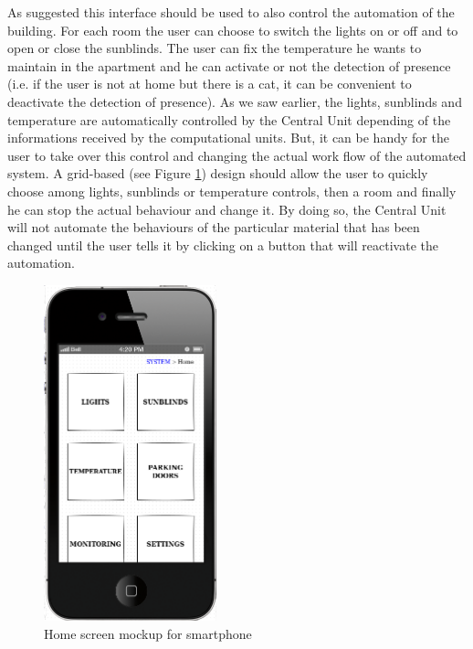 \documentclass{acm_proc_article-sp}
\begin{document}
As suggested this interface should be used to also control the automation of the building.
For each room the user can choose to switch the lights on or off and to open or close the sunblinds.
The user can fix the temperature he wants to maintain in the apartment and he can activate or not the detection of presence (i.e. if the user is not at home but there is a cat, it can be convenient to deactivate the detection of presence).
As we saw earlier, the lights, sunblinds and temperature are automatically controlled by the Central Unit depending of the informations received by the computational units. But, it can be handy for the user to take over this control and changing the actual work flow of the automated system.
A grid-based (see Figure \ref{mockup2}) design should allow the user to quickly choose among lights, sunblinds or temperature controls, then a room and finally he can stop the actual behaviour and change it. By doing so, the Central Unit will not automate the behaviours of the particular material that has been changed until the user tells it by clicking on a button that will reactivate the automation.

        \begin{figure}[htb]
          \begin{center}
            \includegraphics[width=5cm]{mockup2}
            \caption{Home screen mockup for smartphone\label{mockup2}}
          \end{center}
        \end{figure}
\end{document}
